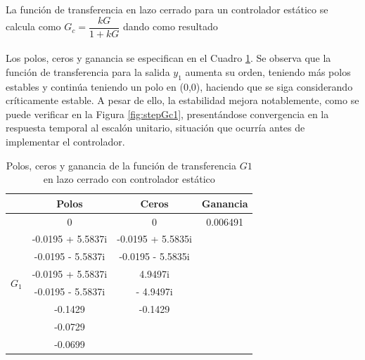 \documentclass[journal]{IEEEtran}
\begin{document}
La función de transferencia en lazo cerrado para un controlador estático se calcula como $G_c = \dfrac{kG}{1+kG}$ dando como resultado
\\

\\

Los polos, ceros y ganancia se especifican en el Cuadro \ref{tab: pzg tf1e}. Se observa que la función de transferencia para la salida $y_1$ aumenta su orden, teniendo más polos estables y continúa teniendo un polo en (0,0), haciendo que se siga considerando críticamente estable. A pesar de ello, la estabilidad mejora notablemente, como se puede verificar en la Figura \ref{fig:stepGc1}, presentándose convergencia en la respuesta temporal al escalón unitario, situación que ocurría antes de implementar el controlador.  

\begin{table}[!h]
\centering
\caption{Polos, ceros y ganancia de la función de transferencia $G1$ en lazo cerrado con controlador estático}
\label{tab: pzg tf1e}
\begin{tabular}{@{}lccc@{}}
\toprule
                  & Polos & Ceros             & Ganancia          \\ \midrule
\multirow{8}{*}{$G_1$} & 0 & 0 & 0.006491 \\
                       &   -0.0195 + 5.5837i      &     -0.0195 + 5.5835i      &         \\
                       &   -0.0195 - 5.5837i     &    -0.0195 - 5.5835i       &         \\
                       &   -0.0195 + 5.5837i      &   4.9497i        &         \\
                       &   -0.0195 - 5.5837i      &    - 4.9497i       &         \\
                       & -0.1429      &     -0.1429      &         \\
                       & -0.0729     &           &         \\
                       & -0.0699     &           &         \\
                       \bottomrule
\end{tabular}
\end{table}
\end{document}
